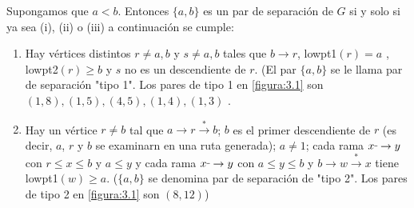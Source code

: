 \begin{lemma}
Supongamos que $a < b$. Entonces $\{a, b\}$ es un par de separación de $G$ si y solo si ya sea (i), (ii) o (iii) a continuación se cumple:
\begin{enumerate}
\item Hay vértices distintos $r \neq a, b$ y $s \neq a, b$ tales que $b \rightarrow r$, lowpt1$\left(r\right) = a$ , lowpt2$\left(r\right) \geq b$ y $s$ no es un descendiente de $r$. (El par $\{a, b\}$ se le llama par de separación "tipo 1". Los pares de tipo 1 en \ref{figura:3.1} son $(1, 8), (1, 5), (4, 5), (1, 4), (1, 3)$ .
\item Hay un vértice $ r \neq b$ tal que $a \rightarrow r \overset{\ast}{\rightarrow} b$; $b$ es el primer descendiente de $r$ (es decir, $a$, $r$ y $b$ se examinarn en una ruta generada);  $a \neq 1$; cada rama $x \rule[1mm]{.1cm}{0.4pt} \rightarrow y$ con $r \leq x \le b$ y  $a \leq y$ y cada rama $x \rule[1mm]{.1cm}{0.4pt} \rightarrow y$ con $a \le y \le b$ y $b \rightarrow w \overset{\ast}{\rightarrow} x$ tiene lowpt1$\left(w\right) \geq a$. ($\{a, b\}$ se denomina par de separación de "tipo 2". Los pares de tipo 2 en \ref{figura:3.1} son $(8, 12)$)
\end{enumerate}
\label{lema:3.13}
\end{lemma}

